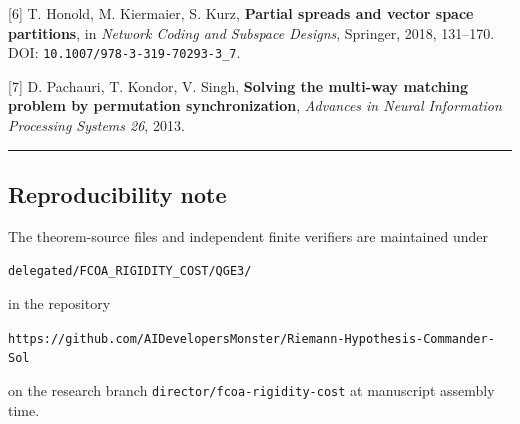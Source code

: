 {[}6{]} T. Honold, M. Kiermaier, S. Kurz, \textbf{Partial spreads and
vector space partitions}, in \emph{Network Coding and Subspace Designs},
Springer, 2018, 131--170. DOI: \texttt{10.1007/978-3-319-70293-3\_7}.

{[}7{]} D. Pachauri, T. Kondor, V. Singh, \textbf{Solving the multi-way
matching problem by permutation synchronization}, \emph{Advances in
Neural Information Processing Systems 26}, 2013.

\begin{center}\rule{0.5\linewidth}{0.5pt}\end{center}

\hypertarget{reproducibility-note}{%
\subsection{Reproducibility note}\label{reproducibility-note}}

The theorem-source files and independent finite verifiers are maintained
under

\texttt{delegated/FCOA\_RIGIDITY\_COST/QGE3/}

in the repository

\texttt{https://github.com/AIDevelopersMonster/Riemann-Hypothesis-Commander-Sol}

on the research branch \texttt{director/fcoa-rigidity-cost} at
manuscript assembly time.
